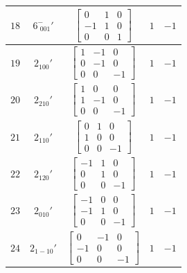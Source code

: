 \documentclass[fleqn,8pt]{jsarticle}
\begin{document}
\begin{longtable}{ccccc}
$ 18 $ & $ 6^{-}_{\,\,001}{}' $ & $ \begin{bmatrix} 0 & 1 & 0 \\ -1 & 1 & 0 \\ 0 & 0 & 1 \end{bmatrix} $ & $ 1 $ & $ -1 $ \\ \hline
$ 19 $ & $ 2{}_{100}{}' $ & $ \begin{bmatrix} 1 & -1 & 0 \\ 0 & -1 & 0 \\ 0 & 0 & -1 \end{bmatrix} $ & $ 1 $ & $ -1 $ \\ \hline
$ 20 $ & $ 2{}_{210}{}' $ & $ \begin{bmatrix} 1 & 0 & 0 \\ 1 & -1 & 0 \\ 0 & 0 & -1 \end{bmatrix} $ & $ 1 $ & $ -1 $ \\ \hline
$ 21 $ & $ 2{}_{110}{}' $ & $ \begin{bmatrix} 0 & 1 & 0 \\ 1 & 0 & 0 \\ 0 & 0 & -1 \end{bmatrix} $ & $ 1 $ & $ -1 $ \\ \hline
$ 22 $ & $ 2{}_{120}{}' $ & $ \begin{bmatrix} -1 & 1 & 0 \\ 0 & 1 & 0 \\ 0 & 0 & -1 \end{bmatrix} $ & $ 1 $ & $ -1 $ \\ \hline
$ 23 $ & $ 2{}_{010}{}' $ & $ \begin{bmatrix} -1 & 0 & 0 \\ -1 & 1 & 0 \\ 0 & 0 & -1 \end{bmatrix} $ & $ 1 $ & $ -1 $ \\ \hline
$ 24 $ & $ 2{}_{1-10}{}' $ & $ \begin{bmatrix} 0 & -1 & 0 \\ -1 & 0 & 0 \\ 0 & 0 & -1 \end{bmatrix} $ & $ 1 $ & $ -1 $ \\
\end{longtable}
\end{document}
